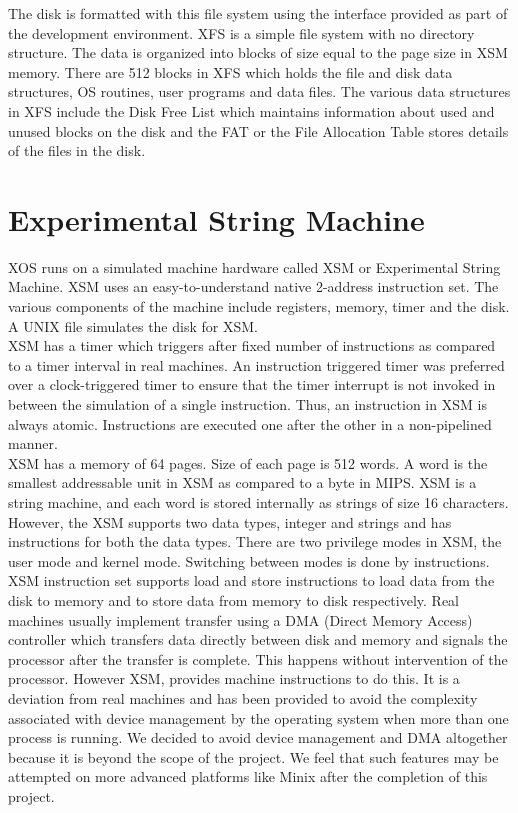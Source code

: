 \documentclass{sig-alternate}
\begin{document}
The disk is formatted with this file system using the interface provided as part of the development environment. XFS is a simple file system with no directory structure. The data is organized into blocks of size equal to the page size in XSM memory. There are 512 blocks in XFS which holds the file and disk data structures, OS routines, user programs and data files. The various data structures in XFS include the Disk Free List which maintains information about used and unused blocks on the disk and the FAT or the File Allocation Table stores details of the files in the disk.


\section{Experimental String Machine }
XOS runs on a simulated machine hardware called XSM or Experimental String Machine. XSM uses an easy-to-understand native 2-address instruction set. The various components of the machine include registers, memory, timer and the disk. A UNIX file simulates the disk for XSM.\\

XSM has a timer which triggers after fixed number of instructions as compared to a timer interval in real machines. An instruction triggered timer was preferred over a clock-triggered timer to ensure that the timer interrupt is not invoked in between the simulation of a single instruction. Thus, an instruction in XSM is always atomic. Instructions are executed one after the other in a non-pipelined manner.\\

XSM has a memory of 64 pages. Size of each page is 512 words. A word is the smallest addressable unit in XSM as compared to a byte in MIPS. XSM is a string machine, and each word is stored internally as strings of size 16 characters.  However, the XSM supports two data types, integer and strings and has instructions for both  the data types. There are two privilege modes in XSM, the user mode and kernel mode. Switching between modes is done by instructions.\\

XSM instruction set supports load and store instructions to load data from the disk to memory and to store data from memory to disk respectively. Real machines usually implement transfer using a DMA (Direct Memory Access) controller which transfers data directly between disk and memory and signals the processor after the transfer is complete. This happens without intervention of the processor. However XSM, provides machine instructions to do this. It is a deviation from real machines and has been provided to avoid the complexity associated with device management by the operating system when more than one process is running. We decided to avoid device management and DMA altogether because it is beyond the scope of the project. We feel that such features may be attempted on more advanced platforms like Minix after the completion of this project. \\
\end{document}
